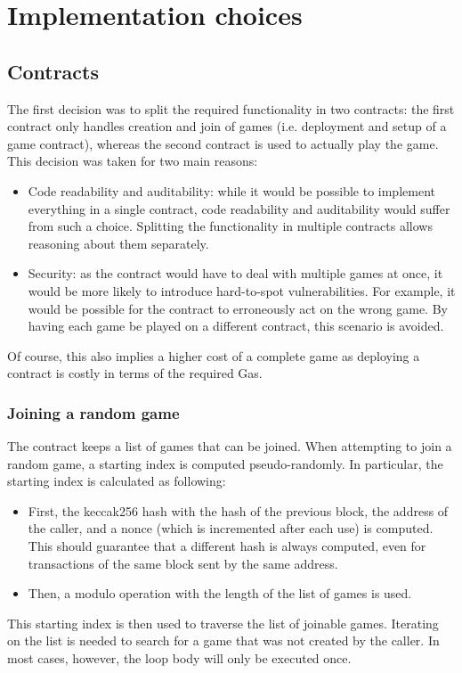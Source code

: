 \section{Implementation choices}

\subsection{Contracts}
The first decision was to split the required functionality in two contracts:
the first contract only handles creation and join of games (i.e. deployment and
setup of a game contract), whereas the second contract is used to actually play
the game. This decision was taken for two main reasons:
\begin{itemize}
	\item Code readability and auditability: while it would be possible to implement
	      everything in a single contract, code readability and auditability would suffer
	      from such a choice. Splitting the functionality in multiple contracts allows
	      reasoning about them separately.
	\item Security: as the contract would have to deal with multiple games at once, it
	      would be more likely to introduce hard-to-spot vulnerabilities. For example, it
	      would be possible for the contract to erroneously act on the wrong game. By
	      having each game be played on a different contract, this scenario is avoided.
\end{itemize}
Of course, this also implies a higher cost of a complete game as deploying a
contract is costly in terms of the required Gas.

\subsubsection{Joining a random game}
The contract keeps a list of games that can be joined. When attempting to join
a random game, a starting index is computed pseudo-randomly. In particular, the
starting index is calculated as following:
\begin{itemize}
	\item First, the keccak256 hash with the hash of the previous block, the address of
	      the caller, and a nonce (which is incremented after each use) is computed. This
	      should guarantee that a different hash is always computed, even for
	      transactions of the same block sent by the same address.
	\item Then, a modulo operation with the length of the list of games is used.
\end{itemize}
This starting index is then used to traverse the list of joinable games.
Iterating on the list is needed to search for a game that was not created by
the caller. In most cases, however, the loop body will only be executed once.

